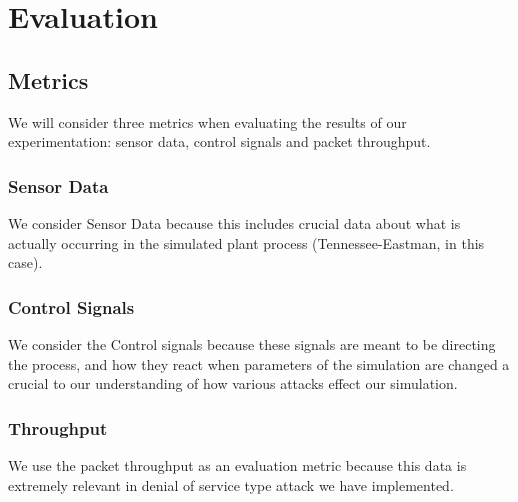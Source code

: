 \section{Evaluation}

\subsection{Metrics}
We will consider three metrics when evaluating the results of our experimentation: sensor data, control signals and packet throughput.
\subsubsection{Sensor Data}
We consider Sensor Data because this includes crucial data about what is actually occurring in the simulated plant process (Tennessee-Eastman, in this case).
\subsubsection{Control Signals}
We consider the Control signals because these signals are meant to be directing the process, and how they react when parameters of the simulation are changed a crucial to our understanding of how various attacks effect our simulation.
\subsubsection{Throughput}
We use the packet throughput as an evaluation metric because this data is extremely relevant in denial of service type attack we have implemented.